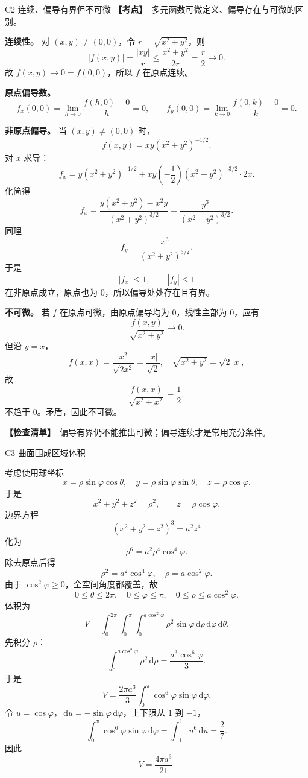 \documentclass[UTF8,zihao=-4,openany]{ctexbook}
\newcommand{\dd}{\,\mathrm{d}}
\newcommand{\point}{\textcolor{warnred}{\bfseries【考点】}}
\newcommand{\checklist}{\textcolor{theogreen}{\bfseries【检查清单】}}
\begin{document}
\begin{solutionbox}{C2 连续、偏导有界但不可微}
\point\ 多元函数可微定义、偏导存在与可微的区别。

\textbf{连续性。} 对 $(x,y)\ne(0,0)$，令 $r=\sqrt{x^2+y^2}$，则
\[
|f(x,y)|=\frac{|xy|}{r}\le\frac{x^2+y^2}{2r}=\frac r2\to0.
\]
故 $f(x,y)\to0=f(0,0)$，所以 $f$ 在原点连续。

\textbf{原点偏导数。}
\[
f_x(0,0)=\lim_{h\to0}\frac{f(h,0)-0}{h}=0,
\qquad
f_y(0,0)=\lim_{k\to0}\frac{f(0,k)-0}{k}=0.
\]

\textbf{非原点偏导。} 当 $(x,y)\ne(0,0)$ 时，
\[
f(x,y)=xy(x^2+y^2)^{-1/2}.
\]
对 $x$ 求导：
\[
f_x=y(x^2+y^2)^{-1/2}+xy\left(-\frac12\right)(x^2+y^2)^{-3/2}\cdot2x.
\]
化简得
\[
f_x=\frac{y(x^2+y^2)-x^2y}{(x^2+y^2)^{3/2}}=\frac{y^3}{(x^2+y^2)^{3/2}}.
\]
同理
\[
f_y=\frac{x^3}{(x^2+y^2)^{3/2}}.
\]
于是
\[
|f_x|\le1,
\qquad |f_y|\le1
\]
在非原点成立，原点也为 $0$，所以偏导处处存在且有界。

\textbf{不可微。} 若 $f$ 在原点可微，由原点偏导均为 $0$，线性主部为 $0$，应有
\[
\frac{f(x,y)}{\sqrt{x^2+y^2}}\to0.
\]
但沿 $y=x$，
\[
f(x,x)=\frac{x^2}{\sqrt{2x^2}}=\frac{|x|}{\sqrt2},
\quad
\sqrt{x^2+y^2}=\sqrt2|x|,
\]
故
\[
\frac{f(x,x)}{\sqrt{x^2+x^2}}=\frac12,
\]
不趋于 $0$。矛盾，因此不可微。

\checklist\ 偏导有界仍不能推出可微；偏导连续才是常用充分条件。
\end{solutionbox}

\begin{solutionbox}{C3 曲面围成区域体积}

考虑使用球坐标
\[
x=\rho\sin\varphi\cos\theta,
\quad y=\rho\sin\varphi\sin\theta,
\quad z=\rho\cos\varphi.
\]
于是
\[
x^2+y^2+z^2=\rho^2,
\qquad z=\rho\cos\varphi.
\]
边界方程
\[
(x^2+y^2+z^2)^3=a^2z^4
\]
化为
\[
\rho^6=a^2\rho^4\cos^4\varphi.
\]
除去原点后得
\[
\rho^2=a^2\cos^4\varphi,
\quad
\rho=a\cos^2\varphi.
\]
由于 $\cos^2\varphi\ge0$，全空间角度都覆盖，故
\[
0\le\theta\le2\pi,
\quad
0\le\varphi\le\pi,
\quad
0\le\rho\le a\cos^2\varphi.
\]
体积为
\[
V=\int_0^{2\pi}\int_0^\pi\int_0^{a\cos^2\varphi}\rho^2\sin\varphi\dd\rho\dd\varphi\dd\theta.
\]
先积分 $\rho$：
\[
\int_0^{a\cos^2\varphi}\rho^2\dd\rho=\frac{a^3\cos^6\varphi}{3}.
\]
于是
\[
V=\frac{2\pi a^3}{3}\int_0^\pi\cos^6\varphi\sin\varphi\dd\varphi.
\]
令 $u=\cos\varphi$，$\dd u=-\sin\varphi\dd\varphi$，上下限从 $1$ 到 $-1$，
\[
\int_0^\pi\cos^6\varphi\sin\varphi\dd\varphi=\int_{-1}^{1}u^6\dd u=\frac{2}{7}.
\]
因此
\[
\boxed{V=\frac{4\pi a^3}{21}.}
\]
\end{solutionbox}
\end{document}
